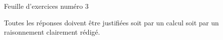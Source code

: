 \documentclass[a4paper,12pt]{article}
\begin{document}

\thispagestyle{empty}

\large
\begin{center}
    Feuille d'exercices numéro 3
\end{center}


\tiny
\begin{center}
    Toutes les réponses doivent être justifiées soit par un calcul soit par un raisonnement clairement rédigé.
\end{center}
\normalsize

\end{document}
